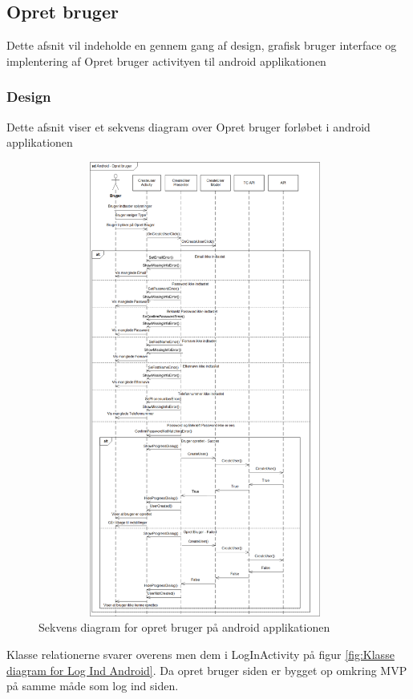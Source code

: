 	\subsection{Opret bruger}
	Dette afsnit vil indeholde en gennem gang af design, grafisk bruger interface og implentering af Opret bruger activityen til android applikationen
	\subsubsection{Design}
	Dette afsnit viser et sekvens diagram over Opret bruger forløbet i android applikationen
	
	\begin{figure} [!ht]
		\begin{center}
			\includegraphics[height=15cm, width=11cm]{Android/Billeder/OpretBrugerSekvens}
		\end{center}
		\caption{Sekvens diagram for opret bruger på android applikationen}
		\label{fig:OpretBrugerSekvens}
	\end{figure}
	
	Klasse relationerne svarer overens men dem i LogInActivity på figur \vref{fig:Klasse diagram for Log Ind Android}. Da opret bruger siden er bygget op omkring MVP på samme måde som log ind siden.
	
